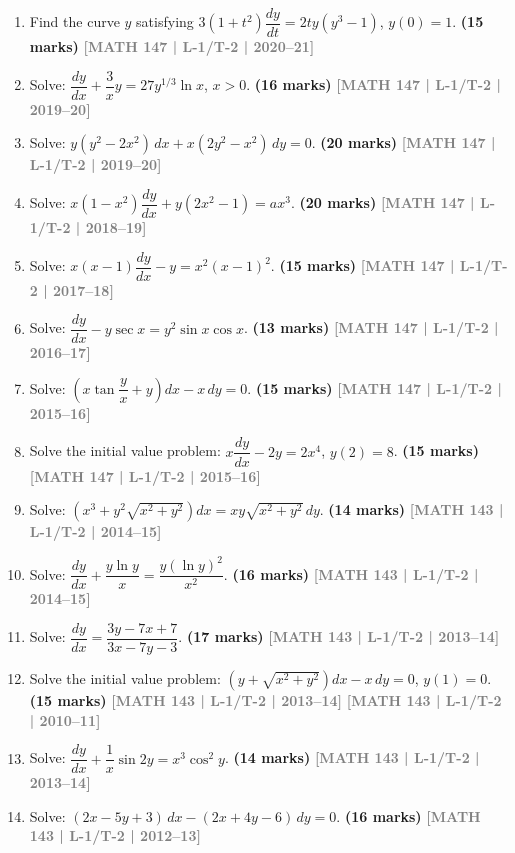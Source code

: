 \documentclass[12pt,a3paper]{article}
\newcommand{\yr}[1]{\hfill\textcolor{gray}{\small\textbf{[#1]}}}
\newcommand{\mk}[1]{\textcolor{orange!70!black}{\small\textbf{(#1 marks)}}}
\begin{document}
\begin{enumerate}
\item Find the curve $y$ satisfying $3(1+t^{2})\dfrac{dy}{dt}=2ty(y^{3}-1)$, $y(0)=1$.
\mk{15} \yr{MATH 147 | L-1/T-2 | 2020--21}

\item Solve: $\dfrac{dy}{dx}+\dfrac{3}{x}y=27y^{1/3}\ln x$, $x>0$.
\mk{16} \yr{MATH 147 | L-1/T-2 | 2019--20}

\item Solve: $y(y^{2}-2x^{2})\,dx+x(2y^{2}-x^{2})\,dy=0$.
\mk{20} \yr{MATH 147 | L-1/T-2 | 2019--20}

\item Solve: $x(1-x^{2})\dfrac{dy}{dx}+y(2x^{2}-1)=ax^{3}$.
\mk{20} \yr{MATH 147 | L-1/T-2 | 2018--19}

\item Solve: $x(x-1)\dfrac{dy}{dx}-y=x^{2}(x-1)^{2}$.
\mk{15} \yr{MATH 147 | L-1/T-2 | 2017--18}

\item Solve: $\dfrac{dy}{dx}-y\sec x=y^{2}\sin x\cos x$.
\mk{13} \yr{MATH 147 | L-1/T-2 | 2016--17}

\item Solve: $\left(x\tan\dfrac{y}{x}+y\right)dx - x\,dy = 0$.
\mk{15} \yr{MATH 147 | L-1/T-2 | 2015--16}

\item Solve the initial value problem: $x\dfrac{dy}{dx}-2y=2x^{4}$, $y(2)=8$.
\mk{15} \yr{MATH 147 | L-1/T-2 | 2015--16}

\item Solve: $\left(x^{3}+y^{2}\sqrt{x^{2}+y^{2}}\right)dx = xy\sqrt{x^{2}+y^{2}}\,dy$.
\mk{14} \yr{MATH 143 | L-1/T-2 | 2014--15}

\item Solve: $\dfrac{dy}{dx}+\dfrac{y\ln y}{x}=\dfrac{y(\ln y)^{2}}{x^{2}}$.
\mk{16} \yr{MATH 143 | L-1/T-2 | 2014--15}

\item Solve: $\dfrac{dy}{dx}=\dfrac{3y-7x+7}{3x-7y-3}$.
\mk{17\textonehalf} \yr{MATH 143 | L-1/T-2 | 2013--14}

\item Solve the initial value problem: $\left(y+\sqrt{x^{2}+y^{2}}\right)dx - x\,dy = 0$, $y(1)=0$.
\mk{15} \yr{MATH 143 | L-1/T-2 | 2013--14} \yr{MATH 143 | L-1/T-2 | 2010--11}

\item Solve: $\dfrac{dy}{dx}+\dfrac{1}{x}\sin 2y = x^{3}\cos^{2}y$.
\mk{14} \yr{MATH 143 | L-1/T-2 | 2013--14}

\item Solve: $(2x-5y+3)\,dx-(2x+4y-6)\,dy=0$.
\mk{16\textonehalf} \yr{MATH 143 | L-1/T-2 | 2012--13}


\end{enumerate}
\end{document}
